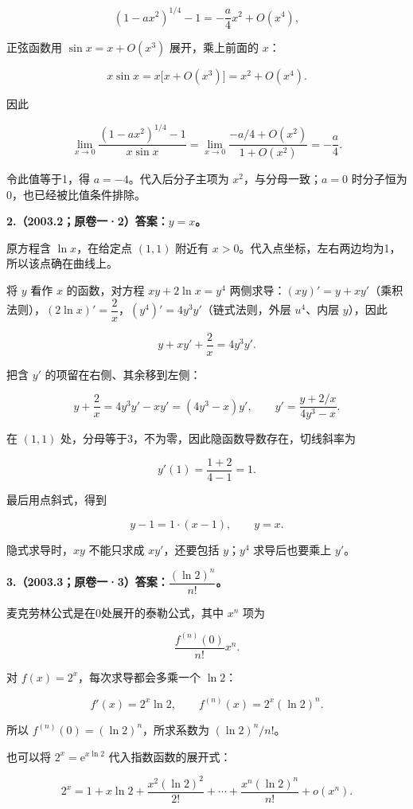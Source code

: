 \documentclass[UTF8,11pt,fontset=windows]{ctexart}
\begin{document}
$$
(1-ax^2)^{1/4}-1=-\frac a4x^2+O(x^4),
$$

正弦函数用 $\sin x=x+O(x^3)$ 展开，乘上前面的 $x$：

$$
x\sin x=x\bigl[x+O(x^3)\bigr]=x^2+O(x^4).
$$

因此

$$
\lim_{x\to0}\frac{(1-ax^2)^{1/4}-1}{x\sin x}
=\lim_{x\to0}\frac{-a/4+O(x^2)}{1+O(x^2)}=-\frac a4.
$$

令此值等于1，得 $\boxed{a=-4}$。代入后分子主项为 $x^2$，与分母一致；$a=0$ 时分子恒为0，也已经被比值条件排除。

\clearpage

\textbf{2.（2003.2；原卷一·2）答案：$y=x$。}

原方程含 $\ln x$，在给定点 $(1,1)$ 附近有 $x>0$。代入点坐标，左右两边均为1，所以该点确在曲线上。

将 $y$ 看作 $x$ 的函数，对方程 $xy+2\ln x=y^4$ 两侧求导：$(xy)'=y+xy'$（乘积法则），$(2\ln x)'=\dfrac2x$，$(y^4)'=4y^3y'$（链式法则，外层 $u^4$、内层 $y$），因此

$$
y+xy'+\frac2x=4y^3y'.
$$

把含 $y'$ 的项留在右侧、其余移到左侧：

$$
y+\frac2x=4y^3y'-xy'=(4y^3-x)y',
\qquad y'=\frac{y+2/x}{4y^3-x}.
$$

在 $(1,1)$ 处，分母等于3，不为零，因此隐函数导数存在，切线斜率为

$$
y'(1)=\frac{1+2}{4-1}=1.
$$

最后用点斜式，得到

$$
y-1=1\cdot(x-1),\qquad \boxed{y=x}.
$$

隐式求导时，$xy$ 不能只求成 $xy'$，还要包括 $y$；$y^4$ 求导后也要乘上 $y'$。

\clearpage

\textbf{3.（2003.3；原卷一·3）答案：$\dfrac{(\ln2)^n}{n!}$。}

麦克劳林公式是在0处展开的泰勒公式，其中 $x^n$ 项为

$$
\frac{f^{(n)}(0)}{n!}x^n.
$$

对 $f(x)=2^x$，每次求导都会多乘一个 $\ln2$：

$$
f'(x)=2^x\ln2,\qquad
f^{(n)}(x)=2^x(\ln2)^n.
$$

所以 $f^{(n)}(0)=(\ln2)^n$，所求系数为 $\boxed{(\ln2)^n/n!}$。

也可以将 $2^x=\mathrm e^{x\ln2}$ 代入指数函数的展开式：

$$
2^x=1+x\ln2+\frac{x^2(\ln2)^2}{2!}+\cdots
+\frac{x^n(\ln2)^n}{n!}+o(x^n).
$$
\end{document}
